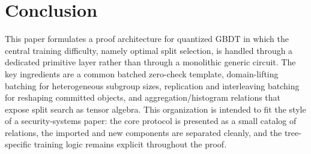 \section{Conclusion}\label{sec:conclusion}

This paper formulates a proof architecture for quantized GBDT in which the
central training difficulty, namely optimal split selection, is handled through
a dedicated primitive layer rather than through a monolithic generic circuit.
The key ingredients are a common batched zero-check template, domain-lifting
batching for heterogeneous subgroup sizes, replication and interleaving
batching for reshaping committed objects, and aggregation/histogram relations
that expose split search as tensor algebra. This organization is intended to fit the
style of a security-systems paper: the core protocol is presented as a small
catalog of relations, the imported and new components are separated cleanly,
and the tree-specific training logic remains explicit throughout the proof.
